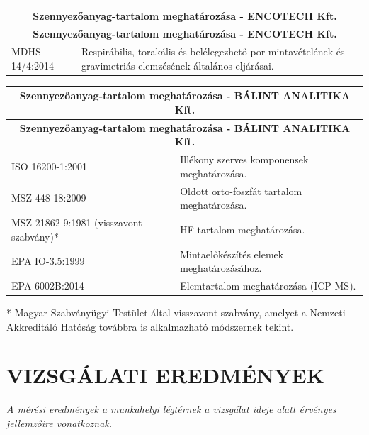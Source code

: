 \documentclass[a4paper,12pt]{article}
\begin{document}
		\begin{longtable}{|p{5cm}|p{10cm}|}
			\hline
			\multicolumn{2}{|c|}{\textbf{Szennyezőanyag-tartalom meghatározása - ENCOTECH Kft.}} \\ 
			\hline
			\endfirsthead
			
			\hline
			\multicolumn{2}{|c|}{\textbf{Szennyezőanyag-tartalom meghatározása - ENCOTECH Kft.}} \\ 
			\hline
			\endhead
			
			\hline
			\endfoot
			
			MDHS 14/4:2014 & Respirábilis, torakális és belélegezhető por mintavételének és gravimetriás elemzésének általános eljárásai. \\ 
			
		\end{longtable}
		
		\begin{longtable}{|p{5cm}|p{10cm}|}
			\hline
			\multicolumn{2}{|c|}{\textbf{Szennyezőanyag-tartalom meghatározása - BÁLINT ANALITIKA Kft.}} \\ 
			\hline
			\endfirsthead
			
			\hline
			\multicolumn{2}{|c|}{\textbf{Szennyezőanyag-tartalom meghatározása - BÁLINT ANALITIKA Kft.}} \\ 

			\hline
			\endhead
			
			\hline
			\endfoot
			
			ISO 16200-1:2001 & Illékony szerves komponensek meghatározása. \\ 
			\hline
			MSZ 448-18:2009 & Oldott orto-foszfát tartalom meghatározása. \\ 
			\hline
			MSZ 21862-9:1981 (visszavont szabvány)* & HF tartalom meghatározása. \\ 
			\hline
			EPA IO-3.5:1999 & Mintaelőkészítés elemek meghatározásához. \\ 
			\hline
			EPA 6002B:2014 & Elemtartalom meghatározása (ICP-MS). \\ 
		\end{longtable}


		\parbox{\textwidth}{\raggedright \footnotesize 
			* Magyar Szabványügyi Testület által visszavont szabvány, amelyet a Nemzeti Akkreditáló Hatóság továbbra is alkalmazható módszernek tekint.
		}
	
	\newpage
	\section{VIZSGÁLATI EREDMÉNYEK}
		\begin{adjustwidth}{1cm}{0cm}
			\textit{A mérési eredmények a munkahelyi légtérnek a vizsgálat ideje alatt érvényes jellemzőire vonatkoznak.}
		\end{adjustwidth}
\end{document}
